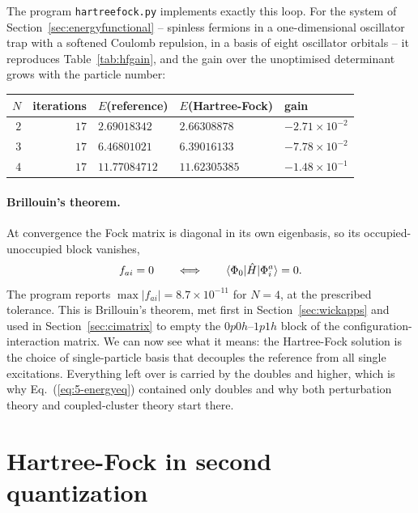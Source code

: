The program \texttt{hartreefock.py} implements exactly this loop.  For the
system of Section~\ref{sec:energyfunctional} -- spinless fermions in a
one-dimensional oscillator trap with a softened Coulomb repulsion, in a basis
of eight oscillator orbitals -- it reproduces Table~\ref{tab:hfgain}, and the
gain over the unoptimised determinant grows with the particle number:
\begin{center}
\renewcommand{\arraystretch}{1.2}
\begin{tabular}{rrlll}
\toprule
$N$ & iterations & $E$(reference) & $E$(Hartree-Fock) & gain\\
\midrule
$2$ & $17$ & $2.69018342$  & $2.66308878$  & $-2.71\times10^{-2}$\\
$3$ & $17$ & $6.46801021$  & $6.39016133$  & $-7.78\times10^{-2}$\\
$4$ & $17$ & $11.77084712$ & $11.62305385$ & $-1.48\times10^{-1}$\\
\bottomrule
\end{tabular}
\end{center}

\paragraph{Brillouin's theorem.}
At convergence the Fock matrix is diagonal in its own eigenbasis, so its
occupied-unoccupied block vanishes,
\begin{equation}
  f_{ai} = 0
  \qquad\Longleftrightarrow\qquad
  \langle \Phi_0 | \hat{H} | \Phi_i^a \rangle = 0 .
  \label{eq:6-brillouin}
\end{equation}
The program reports $\max|f_{ai}| = 8.7\times10^{-11}$ for $N=4$, at the
prescribed tolerance.  This is Brillouin's theorem, met first in
Section~\ref{sec:wickapps} and used in Section~\ref{sec:cimatrix} to empty the
$0p0h$--$1p1h$ block of the configuration-interaction matrix.  We can now see
what it means: the Hartree-Fock solution is the choice of single-particle
basis that decouples the reference from all single excitations.  Everything
left over is carried by the doubles and higher, which is why
Eq.~(\ref{eq:5-energyeq}) contained only doubles and why both perturbation
theory and coupled-cluster theory start there.

\section{Hartree-Fock in second quantization}
\label{sec:hfsecondquant}

